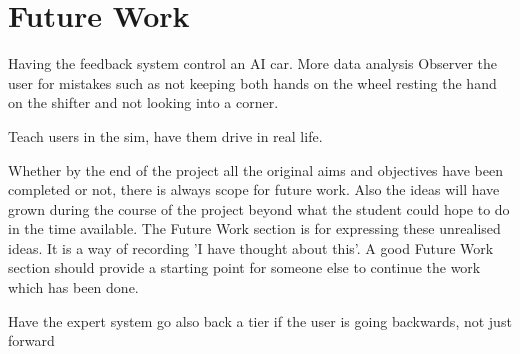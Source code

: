 \section{Future Work}

Having the feedback system control an AI car.
More data analysis
Observer the user for mistakes such as not keeping both hands on the wheel resting the hand on the shifter and not looking into a corner.

Teach users in the sim, have them drive in real life.

Whether by the end of the project all the original aims and objectives have been completed or not,
there is always scope for future work. Also the ideas will have grown during the course of the project
beyond what the student could hope to do in the time available. The Future Work section is for
expressing these unrealised ideas. It is a way of recording 'I have thought about this'. A good Future
Work section should provide a starting point for someone else to continue the work which has been
done. 

Have the expert system go also back a tier if the user is going backwards, not just forward